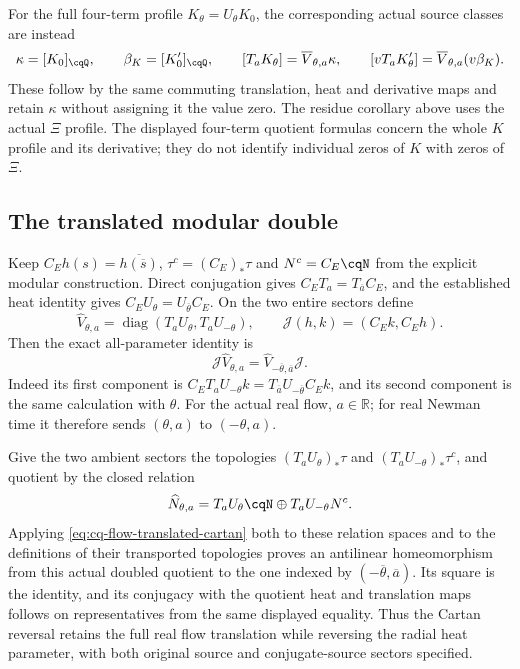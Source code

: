 For the full four-term profile $K_\theta=U_\theta K_0$, the corresponding
actual source classes are instead
\[
 \kappa=[K_0]_{\cqQ},\qquad \beta_K=[K_0']_{\cqQ},\qquad
 [T_aK_\theta]=\overline V_{\theta,a}\kappa,\qquad
 [vT_aK_\theta']=\overline V_{\theta,a}(v\beta_K).
\]
These follow by the same commuting translation, heat and derivative
maps and retain $\kappa$ without assigning it the value zero.
The residue corollary above uses the actual $\Xi$ profile.
The displayed four-term quotient formulas concern the whole $K$
profile and its derivative; they do not identify individual zeros
of $K$ with zeros of $\Xi$.

\subsection{The translated modular double}

Keep $C_Eh(s)=\overline{h(\overline s)}$,
$\tau^c=(C_E)_*\tau$ and $N^c=C_E\cqN$ from the explicit modular
construction. Direct conjugation gives
$C_ET_a=T_{\overline a}C_E$, and the established heat identity gives
$C_EU_\theta=U_{\overline\theta}C_E$.
On the two entire sectors define
\[
 \widehat V_{\theta,a}
   =\operatorname{diag}(T_aU_\theta,T_aU_{-\theta}),\qquad
 \mathcal J(h,k)=(C_Ek,C_Eh).
\]
Then the exact all-parameter identity is
\begin{equation}
 \mathcal J\widehat V_{\theta,a}
 =\widehat V_{-\overline\theta,\overline a}\mathcal J .
 \label{eq:cq-flow-translated-cartan}
\end{equation}
Indeed its first component is
$C_ET_aU_{-\theta}k=T_{\overline a}U_{-\overline\theta}C_Ek$,
and its second component is the same calculation with $\theta$.
For the actual real flow, $a\in\mathbb R$; for real Newman time it
therefore sends $(\theta,a)$ to $(-\theta,a)$.

Give the two ambient sectors the topologies
$(T_aU_\theta)_*\tau$ and $(T_aU_{-\theta})_*\tau^c$, and quotient
by the closed relation
\[
 \widehat N_{\theta,a}
   =T_aU_\theta\cqN\oplus T_aU_{-\theta}N^c .
\]
Applying \eqref{eq:cq-flow-translated-cartan} both to these relation
spaces and to the definitions of their transported topologies proves
an antilinear homeomorphism from this actual doubled quotient to
the one indexed by $(-\overline\theta,\overline a)$.
Its square is the identity, and its conjugacy with the quotient heat
and translation maps follows on representatives from the same
displayed equality. Thus the Cartan reversal retains the full real
flow translation while reversing the radial heat parameter, with
both original source and conjugate-source sectors specified.

